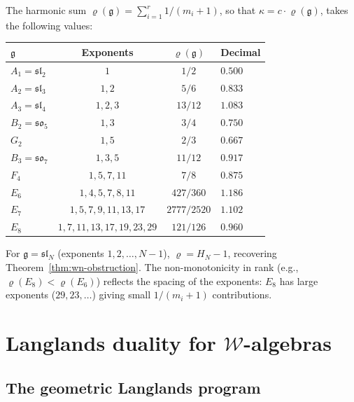 \begin{remark}\label{rem:general-w-kappa-values}
The harmonic sum $\varrho(\mathfrak{g}) = \sum_{i=1}^r 1/(m_i + 1)$, so that $\kappa = c \cdot \varrho(\mathfrak{g})$, takes the following values:
\begin{center}
\renewcommand{\arraystretch}{1.3}
\begin{tabular}{lccl}
\toprule
$\mathfrak{g}$ & Exponents & $\varrho(\mathfrak{g})$ & Decimal \\
\midrule
$A_1 = \mathfrak{sl}_2$ & $1$ & $1/2$ & $0.500$ \\
$A_2 = \mathfrak{sl}_3$ & $1, 2$ & $5/6$ & $0.833$ \\
$A_3 = \mathfrak{sl}_4$ & $1, 2, 3$ & $13/12$ & $1.083$ \\
$B_2 = \mathfrak{so}_5$ & $1, 3$ & $3/4$ & $0.750$ \\
$G_2$ & $1, 5$ & $2/3$ & $0.667$ \\
$B_3 = \mathfrak{so}_7$ & $1, 3, 5$ & $11/12$ & $0.917$ \\
$F_4$ & $1, 5, 7, 11$ & $7/8$ & $0.875$ \\
$E_6$ & $1, 4, 5, 7, 8, 11$ & $427/360$ & $1.186$ \\
$E_7$ & $1, 5, 7, 9, 11, 13, 17$ & $2777/2520$ & $1.102$ \\
$E_8$ & $1, 7, 11, 13, 17, 19, 23, 29$ & $121/126$ & $0.960$ \\
\bottomrule
\end{tabular}
\end{center}
For $\mathfrak{g} = \mathfrak{sl}_N$ (exponents $1, 2, \ldots, N-1$), $\varrho = H_N - 1$, recovering Theorem~\ref{thm:wn-obstruction}.  The non-monotonicity in rank (e.g., $\varrho(E_8) < \varrho(E_6)$) reflects the spacing of the exponents: $E_8$ has large exponents ($29, 23, \ldots$) giving small $1/(m_i + 1)$ contributions.
\end{remark}

\section{Langlands duality for $\mathcal{W}$-algebras}

\subsection{The geometric Langlands program}

